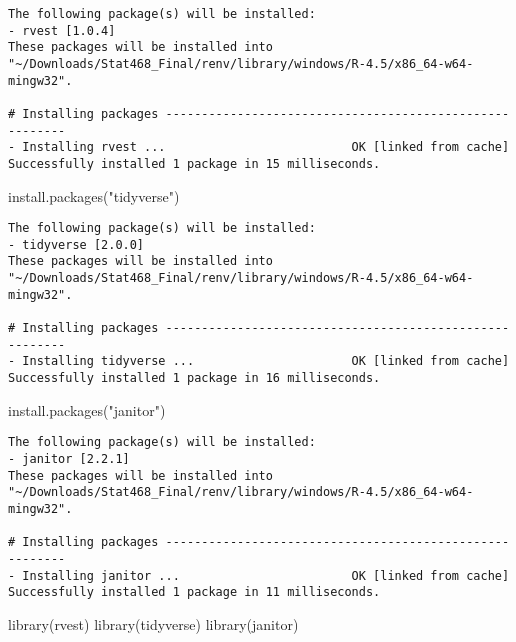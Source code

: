 \documentclass[
  letterpaper,
  DIV=11,
  numbers=noendperiod]{scrreprt}
\newenvironment{Shaded}{\begin{snugshade}}{\end{snugshade}}
\newcommand{\FunctionTok}[1]{\textcolor[rgb]{0.28,0.35,0.67}{#1}}
\newcommand{\NormalTok}[1]{\textcolor[rgb]{0.00,0.23,0.31}{#1}}
\newcommand{\StringTok}[1]{\textcolor[rgb]{0.13,0.47,0.30}{#1}}
\begin{document}
\begin{verbatim}
The following package(s) will be installed:
- rvest [1.0.4]
These packages will be installed into "~/Downloads/Stat468_Final/renv/library/windows/R-4.5/x86_64-w64-mingw32".

# Installing packages --------------------------------------------------------
- Installing rvest ...                          OK [linked from cache]
Successfully installed 1 package in 15 milliseconds.
\end{verbatim}

\begin{Shaded}
\begin{Highlighting}[]
\FunctionTok{install.packages}\NormalTok{(}\StringTok{"tidyverse"}\NormalTok{)}
\end{Highlighting}
\end{Shaded}

\begin{verbatim}
The following package(s) will be installed:
- tidyverse [2.0.0]
These packages will be installed into "~/Downloads/Stat468_Final/renv/library/windows/R-4.5/x86_64-w64-mingw32".

# Installing packages --------------------------------------------------------
- Installing tidyverse ...                      OK [linked from cache]
Successfully installed 1 package in 16 milliseconds.
\end{verbatim}

\begin{Shaded}
\begin{Highlighting}[]
\FunctionTok{install.packages}\NormalTok{(}\StringTok{"janitor"}\NormalTok{)}
\end{Highlighting}
\end{Shaded}

\begin{verbatim}
The following package(s) will be installed:
- janitor [2.2.1]
These packages will be installed into "~/Downloads/Stat468_Final/renv/library/windows/R-4.5/x86_64-w64-mingw32".

# Installing packages --------------------------------------------------------
- Installing janitor ...                        OK [linked from cache]
Successfully installed 1 package in 11 milliseconds.
\end{verbatim}

\begin{Shaded}
\begin{Highlighting}[]
\FunctionTok{library}\NormalTok{(rvest)}
\FunctionTok{library}\NormalTok{(tidyverse)}
\FunctionTok{library}\NormalTok{(janitor)}
\end{Highlighting}
\end{Shaded}
\end{document}
